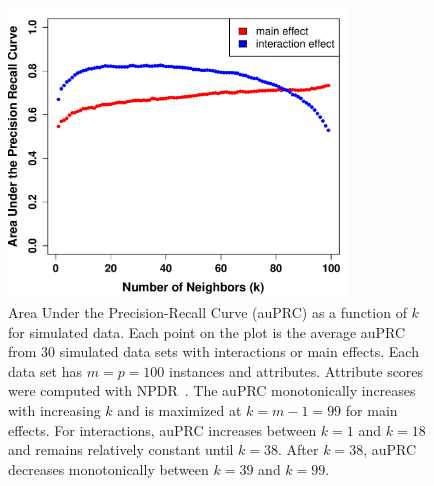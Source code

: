 \documentclass[10pt,letterpaper]{article}
\begin{document}
\begin{figure}[!bht]
	\centering
	\includegraphics[width=0.8\textwidth]{auPRC_vs_k.pdf}
	\caption{Area Under the Precision-Recall Curve (auPRC) as a function of $k$ for simulated data. Each point on the plot is the average auPRC from 30 simulated data sets with interactions or main effects. Each data set has $m=p=100$ instances and attributes. Attribute scores were computed with NPDR~\cite{npdr2}. The auPRC monotonically increases with increasing $k$ and is maximized at $k=m-1=99$ for main effects. For interactions, auPRC increases between $k=1$ and $k=18$ and remains relatively constant until $k=38$. After $k=38$, auPRC decreases monotonically between $k=39$ and $k=99$.}\label{fig:auPRC-vs-k}
\end{figure}


\end{document}
